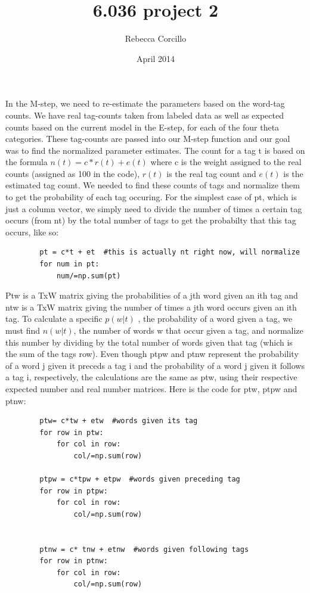 \documentclass{article}
\title{6.036 project 2}
\author{Rebecca Corcillo }
\date{April 2014}
\begin{document}
\maketitle

\section{}
In the M-step, we need to re-estimate the parameters based on the word-tag counts.  We have real tag-counts taken from labeled data as well as expected counts based on the current model in the E-step, for each of the four theta categories.  These tag-counts are passed into our M-step function and our goal was to find the normalized parameter estimates.  \newline
The count for a tag t is based on the formula $n(t) = c * r(t) + e(t)$ where c is the weight assigned to the real counts (assigned as 100 in the code), $r(t)$ is the real tag count and $e(t)$ is the estimated tag count.  We needed to find these counts of tags and normalize them to get the probability of each tag occuring.  For the simplest case of pt, which is just a column vector, we simply need to divide the number of times a certain tag occurs (from nt) by the total number of tags to get the probabilty that this tag occurs, like so: 
\begin{verbatim}
        pt = c*t + et  #this is actually nt right now, will normalize
        for num in pt:
            num/=np.sum(pt)
\end{verbatim}
Ptw is a TxW matrix giving the probabilities of a jth word given an ith tag and ntw is a TxW matrix giving the number of times a jth word occurs given an ith tag. To calculate a specific $p(w|t)$ , the probability of a word given a tag, we must find $n(w|t)$, the number of words w that occur given a tag, and normalize this number by dividing by the total number of words given that tag (which is the sum of the tags row).  Even though ptpw and ptnw represent the probability of a word j given it preceds a tag i and the probability of a word j given it follows a tag i, respectively, the calculations are the same as ptw, using their respective expected number and real number matrices. Here is the code for ptw, ptpw and ptnw:

\begin{verbatim}
        ptw= c*tw + etw  #words given its tag
        for row in ptw:
            for col in row:
                col/=np.sum(row)
             
        ptpw = c*tpw + etpw  #words given preceding tag 
        for row in ptpw:
            for col in row:
                col/=np.sum(row)
             
            
        ptnw = c* tnw + etnw  #words given following tags
        for row in ptnw:
            for col in row:
                col/=np.sum(row)
\end{verbatim}
\end{document}
